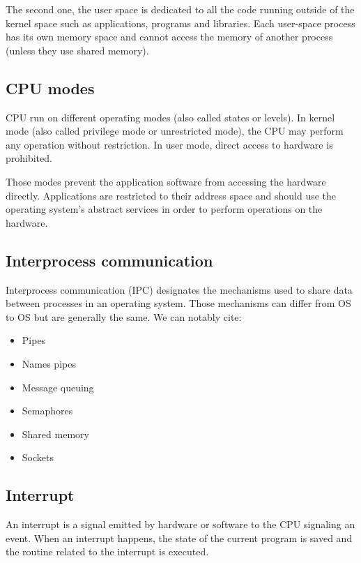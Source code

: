 The second one, the user space is dedicated to all the code running outside of the kernel space such as applications, programs and libraries.
Each user-space process has its own memory space and cannot access the memory of another process (unless they use shared memory).

\subsection{CPU modes}
CPU run on different operating modes (also called states or levels).
In kernel mode (also called privilege mode or unrestricted mode), the CPU may perform any operation without restriction.
In user mode, direct access to hardware is prohibited.

Those modes prevent the application software from accessing the hardware directly.
Applications are restricted to their address space 
    and should use the operating system's abstract services in order to perform operations on the hardware.

\subsection{Interprocess communication}
Interprocess communication (IPC) designates the mechanisms used to share data between processes in an operating system.
Those mechanisms can differ from OS to OS but are generally the same.
We can notably cite:
\begin{itemize}
    \item Pipes
    \item Names pipes
    \item Message queuing
    \item Semaphores
    \item Shared memory
    \item Sockets
\end{itemize}

\subsection{Interrupt}
An interrupt is a signal emitted by hardware or software to the CPU signaling an event.
When an interrupt happens, the state of the current program is saved 
    and the routine related to the interrupt is executed.

